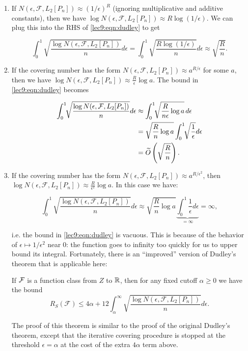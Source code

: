 \begin{enumerate}
\item If $N(\epsilon, \mathcal{F}, L_2[P_n])\approx (1 / \epsilon)^R$ (ignoring multiplicative and additive constants), then we have $\log N(\epsilon, \mathcal{F}, L_2[P_n]) \approx  R\log (1/\epsilon)$. We can plug this into the RHS of \eqref{lec9:eqn:dudley} to get
        
\begin{equation}
\int_{0}^{1}\sqrt{\frac{\log N(\epsilon, \mathcal{F}, L_2[P_n])}{n}}d\epsilon = \int_{0}^1\sqrt{\frac{R\log(1/\epsilon)}{n}}d\epsilon \approx \sqrt{\frac{R}{n}}.
\end{equation}
            
\item If the covering number has the form $N(\epsilon, \mathcal{F}, L_2[P_n])\approx a^{R/\epsilon}$ for some $a$, then we have $\log N(\epsilon, \mathcal{F}, L_2[P_n]) \approx \frac{R}{\epsilon}\log a$. The bound in \eqref{lec9:eqn:dudley} becomes
        
\begin{align}
\int_0^1\!\!\sqrt{\frac{\log N(\epsilon, \mathcal{F}, L_2[P_n])}{n}}d\epsilon &\approx \int_0^1\!\!\sqrt{\frac{R}{n\epsilon}\log a}\, d\epsilon \\
&= \sqrt{\frac{R}{n}\log a} \int_0^1\!\!\sqrt{\frac{1}{\epsilon}}d\epsilon \\
&= \widetilde{O} \left(\sqrt{\frac{R}{n}}\right).
\end{align}
        
\item If the covering number has the form $N(\epsilon, \mathcal{F}, L_2[P_n])\approx a^{R/\epsilon^2}$, then $\log N(\epsilon, \mathcal{F}, L_2[P_n])\approx \frac{R}{\epsilon^2}\log a$. In this case we have:
        
\begin{equation}\int_0^1\sqrt{\frac{\log N(\epsilon, \mathcal{F}, L_2[P_n])}{n}}d\epsilon \approx \sqrt{\frac{R}{n}\log a} \underbrace{\int_0^1\frac{1}{\epsilon}d\epsilon}_{=\infty}=\infty,
\end{equation}

i.e. the bound in \eqref{lec9:eqn:dudley} is vacuous. This is because of the behavior of $\epsilon \mapsto 1/\epsilon^2$ near 0: the function goes to infinity too quickly for us to upper bound its integral. Fortunately, there is an ``improved'' version of Dudley's theorem that is applicable here:
        
\begin{theorem}\label{lec9:thm:better-dudley}
If $\mathcal F$ is a function class from $Z$ to $\mathbb R$, then for any fixed cutoff $\alpha \geq 0$ we have the bound
\begin{equation}\label{lec9:eqn:better-dudley}
R_S(\mathcal{F})\leq 4\alpha + 12\int_{\alpha}^{\infty}\sqrt{\frac{\log N(\epsilon, \mathcal{F}, L_2[P_n])}{n}}d\epsilon.      
\end{equation}
\end{theorem}
The proof of this theorem is similar to the proof of the original Dudley's theorem, except that the iterative covering procedure is stopped at the threshold $\epsilon = \alpha$ at the cost of the extra $4\alpha$ term above.
        

\end{enumerate}
